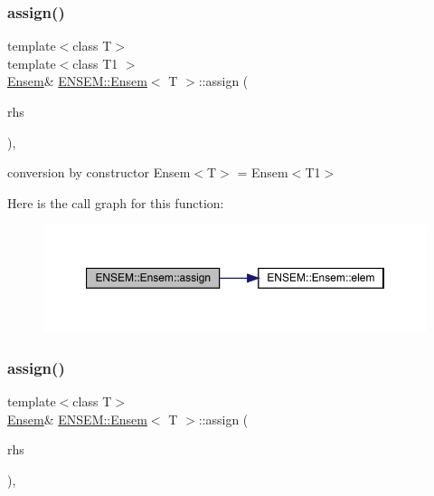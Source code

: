 \subsubsection{\texorpdfstring{assign()}{assign()}\hspace{0.1cm}{\footnotesize\ttfamily [4/8]}}
{\footnotesize\ttfamily template$<$class T$>$ \\
template$<$class T1 $>$ \\
\mbox{\hyperlink{classENSEM_1_1Ensem}{Ensem}}\& \mbox{\hyperlink{classENSEM_1_1Ensem}{E\+N\+S\+E\+M\+::\+Ensem}}$<$ T $>$\+::assign (\begin{DoxyParamCaption}\item[{const \mbox{\hyperlink{classENSEM_1_1Ensem}{Ensem}}$<$ T1 $>$ \&}]{rhs }\end{DoxyParamCaption})\hspace{0.3cm}{\ttfamily [inline]}, {\ttfamily [protected]}}



conversion by constructor Ensem$<$\+T$>$ = Ensem$<$\+T1$>$ 

Here is the call graph for this function\+:
\nopagebreak
\begin{figure}[H]
\begin{center}
\leavevmode
\includegraphics[width=350pt]{d7/d3e/classENSEM_1_1Ensem_a43d968c090e5f6c518881cf7ff44d200_cgraph}
\end{center}
\end{figure}
\mbox{\label{classENSEM_1_1Ensem_ae31c239c3dc966eaad70ec90489f5476}} 
\subsubsection{\texorpdfstring{assign()}{assign()}\hspace{0.1cm}{\footnotesize\ttfamily [5/8]}}
{\footnotesize\ttfamily template$<$class T$>$ \\
\mbox{\hyperlink{classENSEM_1_1Ensem}{Ensem}}\& \mbox{\hyperlink{classENSEM_1_1Ensem}{E\+N\+S\+E\+M\+::\+Ensem}}$<$ T $>$\+::assign (\begin{DoxyParamCaption}\item[{const typename \mbox{\hyperlink{structENSEM_1_1WordType}{Word\+Type}}$<$ T $>$\+::Type\+\_\+t \&}]{rhs }\end{DoxyParamCaption})\hspace{0.3cm}{\ttfamily [inline]}, {\ttfamily [protected]}}



